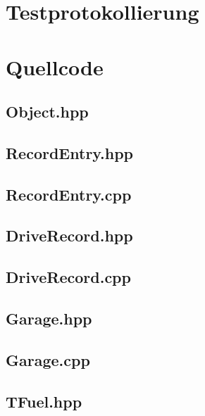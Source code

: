 \documentclass[12pt,naustrian,a4widepaper]{scrartcl}
\begin{document}
\clearpage
\section{Testprotokollierung}


\clearpage
\section{Quellcode}

\subsection{Object.hpp}

\clearpage

\subsection{RecordEntry.hpp}


\clearpage
\subsection{RecordEntry.cpp}

\clearpage

\subsection{DriveRecord.hpp}


\clearpage
\subsection{DriveRecord.cpp}

\clearpage
\subsection{Garage.hpp}

\clearpage

\subsection{Garage.cpp}

\clearpage

\subsection{TFuel.hpp}

\clearpage
\end{document}
